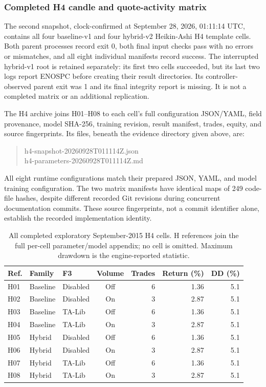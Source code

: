 \subsubsection{Completed H4 candle and quote-activity matrix} \label{subsec:h4-snapshot}

The second snapshot, clock-confirmed at September 28, 2026, 01:11:14 UTC, contains all four baseline-v1 and four hybrid-v2 Heikin-Ashi H4 template cells. Both parent processes record exit 0, both final input checks pass with no errors or mismatches, and all eight individual manifests record success. The interrupted hybrid-v1 root is retained separately: its first two cells succeeded, but its last two logs report ENOSPC before creating their result directories. Its controller-observed parent exit was 1 and its final integrity report is missing. It is not a completed matrix or an additional replication.

The H4 archive joins H01--H08 to each cell's full configuration JSON/YAML, field provenance, model SHA-256, training revision, result manifest, trades, equity, and source fingerprints. Its files, beneath the evidence directory given above, are:
\begin{quote}
\small\ttfamily
h4-snapshot-20260928T011114Z.json\\
h4-parameters-20260928T011114Z.md
\end{quote}
All eight runtime configurations match their prepared JSON, YAML, and model training configuration. The two matrix manifests have identical maps of 249 code-file hashes, despite different recorded Git revisions during concurrent documentation commits. These source fingerprints, not a commit identifier alone, establish the recorded implementation identity.

\begin{table}[htbp]
\centering
\caption{All completed exploratory September-2015 H4 cells. H references join the full per-cell parameter/model appendix; no cell is omitted. Maximum drawdown is the engine-reported statistic.}
\label{tab:h4-results}
\small
\begin{tabular}{lllcrrr}
\toprule
\textbf{Ref.} & \textbf{Family} & \textbf{F3} & \textbf{Volume} & \textbf{Trades} & \textbf{Return (\%)} & \textbf{DD (\%)} \\
\midrule
H01 & Baseline & Disabled & Off & 6 & 1.36 & 5.1 \\
H02 & Baseline & Disabled & On & 3 & 2.87 & 5.1 \\
H03 & Baseline & TA-Lib & Off & 6 & 1.36 & 5.1 \\
H04 & Baseline & TA-Lib & On & 3 & 2.87 & 5.1 \\
H05 & Hybrid & Disabled & Off & 6 & 1.36 & 5.1 \\
H06 & Hybrid & Disabled & On & 3 & 2.87 & 5.1 \\
H07 & Hybrid & TA-Lib & Off & 6 & 1.36 & 5.1 \\
H08 & Hybrid & TA-Lib & On & 3 & 2.87 & 5.1 \\
\bottomrule
\end{tabular}
\end{table}

